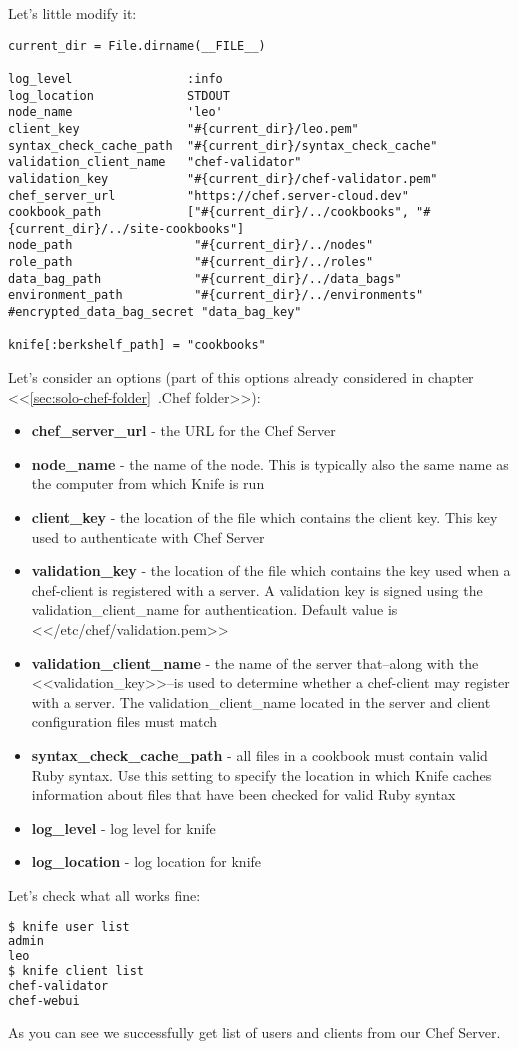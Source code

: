 Let's little modify it:

\begin{lstlisting}[label=lst:my-server-cloud-knife4,title=my-server-cloud/.chef/knife.rb]
current_dir = File.dirname(__FILE__)

log_level                :info
log_location             STDOUT
node_name                'leo'
client_key               "#{current_dir}/leo.pem"
syntax_check_cache_path  "#{current_dir}/syntax_check_cache"
validation_client_name   "chef-validator"
validation_key           "#{current_dir}/chef-validator.pem"
chef_server_url          "https://chef.server-cloud.dev"
cookbook_path            ["#{current_dir}/../cookbooks", "#{current_dir}/../site-cookbooks"]
node_path                 "#{current_dir}/../nodes"
role_path                 "#{current_dir}/../roles"
data_bag_path             "#{current_dir}/../data_bags"
environment_path          "#{current_dir}/../environments"
#encrypted_data_bag_secret "data_bag_key"

knife[:berkshelf_path] = "cookbooks"
\end{lstlisting}

Let's consider an options (part of this options already considered in chapter <<\ref{sec:solo-chef-folder}~.Chef folder>>):

\begin{itemize}
  \item \textbf{chef\_server\_url} - the URL for the Chef Server
  \item \textbf{node\_name} - the name of the node. This is typically also the same name as the computer from which Knife is run
  \item \textbf{client\_key} - the location of the file which contains the client key. This key used to authenticate with Chef Server
  \item \textbf{validation\_key} - the location of the file which contains the key used when a chef-client is registered with a server. A validation key is signed using the validation\_client\_name for authentication. Default value is <</etc/chef/validation.pem>>
  \item \textbf{validation\_client\_name} - the name of the server that–along with the <<validation\_key>>–is used to determine whether a chef-client may register with a server. The validation\_client\_name located in the server and client configuration files must match
  \item \textbf{syntax\_check\_cache\_path} - all files in a cookbook must contain valid Ruby syntax. Use this setting to specify the location in which Knife caches information about files that have been checked for valid Ruby syntax
  \item \textbf{log\_level} - log level for knife
  \item \textbf{log\_location} - log location for knife
\end{itemize}

Let's check what all works fine:

\begin{lstlisting}[language=Bash,label=lst:my-server-cloud-knife5]
$ knife user list
admin
leo
$ knife client list
chef-validator
chef-webui
\end{lstlisting}

As you can see we successfully get list of users and clients from our Chef Server.